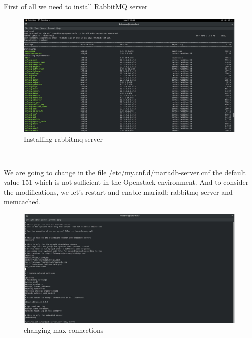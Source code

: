 \begin{spacing}{1.2}
\par First of all we need to install RabbitMQ server
\\
\begin{figure}[!htb] 
\begin{center} 
\includegraphics[width=1\linewidth]{Cloud/Pre-Requirements/Installing rabbitmq-server} 
\end{center} 
\caption{Installing rabbitmq-server} 
\end{figure}  \FloatBarrier
\\
\par We are going to change in the file /etc/my.cnf.d/mariadb-server.cnf the default value 151
which is not sufficient in the Openstack environment. And to consider the modifications, we
let's restart and enable mariadb rabbitmq-server and memcached. 
\\
\begin{figure}[!htb] 
\begin{center} 
\includegraphics[width=1\linewidth]{Cloud/Pre-Requirements/changing max_connections} 
\end{center} 
\caption{changing max connections} 
\end{figure}  \FloatBarrier
\\

\end{spacing}
